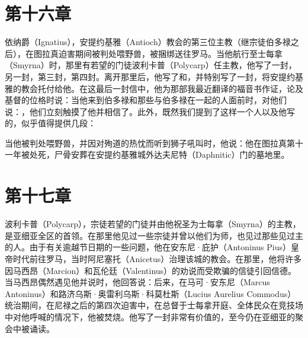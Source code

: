 
\section{第十六章}

依纳爵（Ignatius），安提约基雅（Antioch）教会的第三位主教（继宗徒伯多禄之后），在图拉真迫害期间被判处喂野兽，被捆绑送往罗马。当他航行至士每拿（Smyrna）时，那里有若望的门徒波利卡普（Polycarp）任主教，他写了一封，另一封，第三封，第四封。离开那里后，他写了和，并特别写了一封，将安提约基雅的教会托付给他。在这最后一封信中，他为那部我最近翻译的福音书作证，论及基督的位格时说：当他来到伯多禄和那些与伯多禄在一起的人面前时，对他们说：，他们立刻触摸了他并相信了。\newline{}此外，既然我们提到了这样一个人以及他写的，似乎值得提供几段：\par

当他被判处喂野兽，并因对殉道的热忱而听到狮子吼叫时，他说：他在图拉真第十一年被处死，尸骨安葬在安提约基雅城外达夫尼特（Daphnitic）门的墓地里。\par


\section{第十七章}

波利卡普（Polycarp），宗徒若望的门徒并由他祝圣为士每拿（Smyrna）的主教，是亚细亚全区的首领。在那里他见过一些宗徒并曾以他们为师，也见过那些见过主的人。由于有关逾越节日期的一些问题，他在安东尼·庇护（Antoninus Pius）皇帝时代前往罗马，当时阿尼塞托（Anicetus）治理该城的教会。在那里，他将许多因马西昂（Marcion）和瓦伦廷（Valentinus）的劝说而受欺骗的信徒引回信德。当马西昂偶然遇见他并说时，他回答说：后来，在马可·安东尼（Marcus Antoninus）和路济乌斯·奥雷利乌斯·科莫杜斯（Lucius Aurelius Commodus）统治期间，在尼禄之后的第四次迫害中，在总督于士每拿开庭、全体民众在竞技场中对他呼喊的情况下，他被焚烧。他写了一封非常有价值的，至今仍在亚细亚的聚会中被诵读。\par

